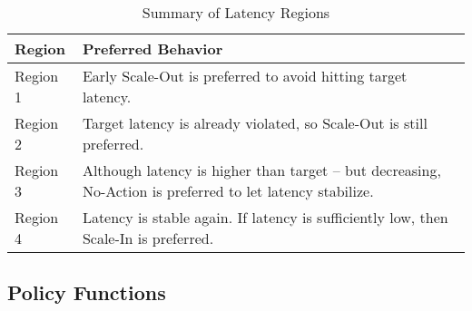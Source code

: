 \begin{table*}[h]
    \begin{tabular}{ll}
        \toprule
        \textbf{Region} & \textbf{Preferred Behavior}\\
        \midrule
        Region 1 & Early Scale-Out is preferred to avoid hitting target latency.\\
        Region 2 & Target latency is already violated, so Scale-Out is still preferred.\\
        Region 3 & Although latency is higher than target -- but decreasing, No-Action is preferred to let latency stabilize.\\
        Region 4 & Latency is stable again. If latency is sufficiently low, then Scale-In is preferred.\\
        \bottomrule
    \end{tabular}
    \centering
    \caption{Summary of Latency Regions}
    \label{des:tab:rules}
\end{table*}

\clearpage
\subsection{Policy Functions}
\label{des:pol}

